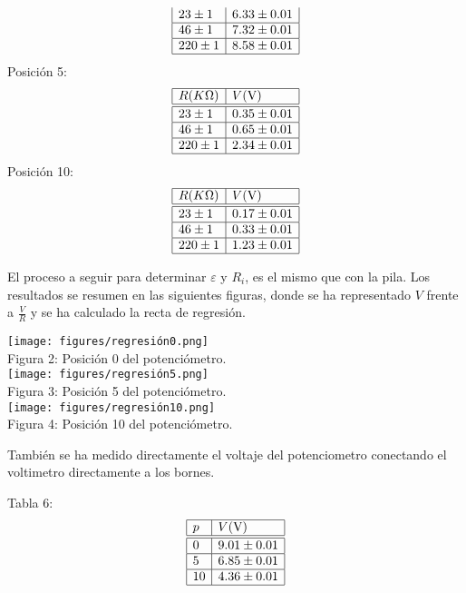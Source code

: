 \documentclass{article}
\begin{document}
\begin{multicols}{2}
\begin{center}
$$\begin{array}{|l|l|}
      23\pm1  & 6.33\pm0.01 \\ \hline
      46\pm1  & 7.32\pm0.01 \\ \hline
      220\pm1 & 8.58\pm0.01 \\ \hline
  \end{array}
  $$
  Posición 5:
  $$
  \begin{array}{|l|l|}\hline
      R(K\Omega) & V\text{(V)} \\ \hline \hline
      23\pm1  & 0.35\pm0.01 \\ \hline
      46\pm1  & 0.65\pm0.01 \\ \hline
      220\pm1 & 2.34\pm0.01 \\ \hline
  \end{array}
  $$
  Posición 10:
  $$
  \begin{array}{|l|l|}\hline
      R(K\Omega) & V\text{(V)} \\ \hline \hline
      23\pm1  & 0.17\pm0.01 \\ \hline
      46\pm1  & 0.33\pm0.01 \\ \hline
      220\pm1 & 1.23\pm0.01 \\ \hline
  \end{array}
  $$
\end{center}
El proceso a seguir para determinar $\varepsilon$ y $R_i$, es el mismo que con la pila. Los resultados se resumen en las siguientes figuras, donde se ha representado $V$ frente a $\frac{V}{R}$ y se ha calculado la recta de regresión.
\begin{center}
  \texttt{[image: figures/regresión0.png]}\\
  Figura 2: Posición 0 del potenciómetro.\\
  $\text{ }$\\
  $\text{ }$\\
  \texttt{[image: figures/regresión5.png]}\\
  Figura 3: Posición 5 del potenciómetro.\\
  $\text{ }$\\
  $\text{ }$\\
  \texttt{[image: figures/regresión10.png]}\\
  Figura 4: Posición 10 del potenciómetro.\\
\end{center}
También se ha medido directamente el voltaje del potenciometro conectando el voltimetro directamente a los bornes.
\begin{center}
  Tabla 6:
  $$
  \begin{array}{|l|l|}\hline
    p & V\text{(V)} \\ \hline \hline
    0  & 9.01\pm0.01 \\ \hline
    5  & 6.85\pm0.01 \\ \hline
    10 & 4.36\pm0.01 \\ \hline
\end{array}
  $$
\end{center}

\end{multicols}
\end{document}

